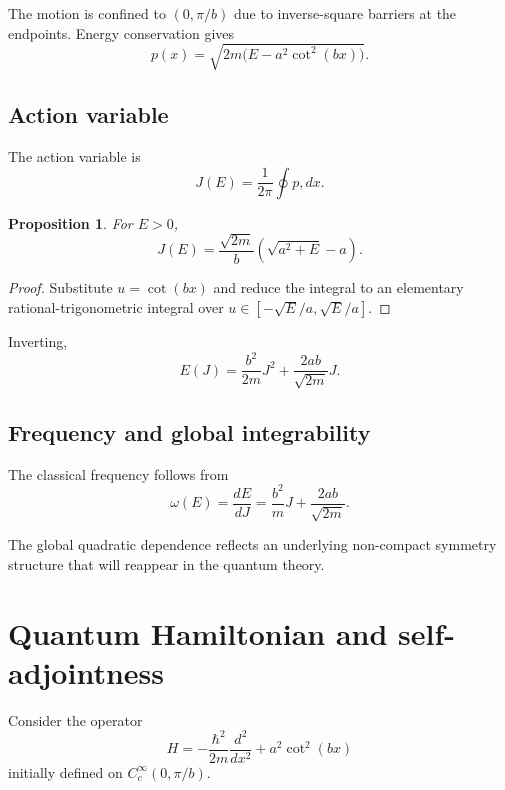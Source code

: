 \documentclass[11pt]{article}
\newtheorem{proposition}[theorem]{Proposition}
\begin{document}
The motion is confined to $(0,\pi/b)$ due to inverse-square barriers
at the endpoints. Energy conservation gives
\begin{equation}
p(x)=\sqrt{2m\big(E-a^2\cot^2(bx)\big)}.
\end{equation}

\subsection{Action variable}

The action variable is
\begin{equation}
J(E)=\frac{1}{2\pi}\oint p,dx.
\end{equation}

\begin{proposition}
For $E>0$,
\begin{equation}
J(E)=\frac{\sqrt{2m}}{b}
\left(\sqrt{a^2+E}-a\right).
\end{equation}
\end{proposition}

\begin{proof}
Substitute $u=\cot(bx)$ and reduce the integral to an elementary
rational-trigonometric integral over
$u\in[-\sqrt{E}/a,\sqrt{E}/a]$.
\end{proof}

Inverting,
\begin{equation}
E(J)=\frac{b^2}{2m}J^2+\frac{2ab}{\sqrt{2m}}J.
\end{equation}

\subsection{Frequency and global integrability}

The classical frequency follows from
\begin{equation}
\omega(E)=\frac{dE}{dJ}
=\frac{b^2}{m}J+\frac{2ab}{\sqrt{2m}}.
\end{equation}

The global quadratic dependence reflects an underlying non-compact
symmetry structure that will reappear in the quantum theory.

\section{Quantum Hamiltonian and self-adjointness}

Consider the operator
\begin{equation}
H=-\frac{\hbar^2}{2m}\frac{d^2}{dx^2}+a^2\cot^2(bx)
\end{equation}
initially defined on $C_c^\infty(0,\pi/b)$.
\end{document}

